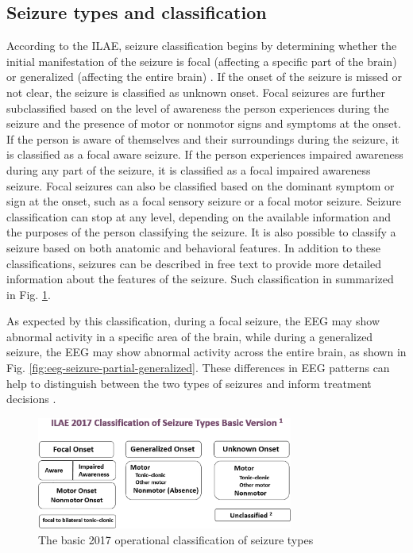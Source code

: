 \subsection{Seizure types and classification}

According to the \gls{ILAE}, seizure classification begins by determining whether the initial manifestation of the seizure is focal (affecting a specific part of the brain) or generalized (affecting the entire brain) \cite{fisher_instruction_2017, fisher_operational_2017}. If the onset of the seizure is missed or not clear, the seizure is classified as unknown onset. Focal seizures are further subclassified based on the level of awareness the person experiences during the seizure and the presence of motor or nonmotor signs and symptoms at the onset. If the person is aware of themselves and their surroundings during the seizure, it is classified as a focal aware seizure. If the person experiences impaired awareness during any part of the seizure, it is classified as a focal impaired awareness seizure. Focal seizures can also be classified based on the dominant symptom or sign at the onset, such as a focal sensory seizure or a focal motor seizure. Seizure classification can stop at any level, depending on the available information and the purposes of the person classifying the seizure. It is also possible to classify a seizure based on both anatomic and behavioral features. In addition to these classifications, seizures can be described in free text to provide more detailed information about the features of the seizure. Such classification in summarized in Fig. \ref{fig:ILAE-seizure-types}.

As expected by this classification, during a focal seizure, the \gls{EEG} may show abnormal activity in a specific area of the brain, while during a generalized seizure, the \gls{EEG} may show abnormal activity across the entire brain, as shown in Fig. \ref{fig:eeg-seizure-partial-generalized}. These differences in \gls{EEG} patterns can help to distinguish between the two types of seizures and inform treatment decisions \cite{raga_electroclinical_2021}.


\begin{figure}[t]
    \centering
    \includegraphics[width=0.75\textwidth]{images/Th-background/ILAE-seizure-types.png}
    \caption{The basic  2017 operational classification of seizure types \cite{fisher_instruction_2017, fisher_operational_2017}}
    \label{fig:ILAE-seizure-types}
\end{figure}

